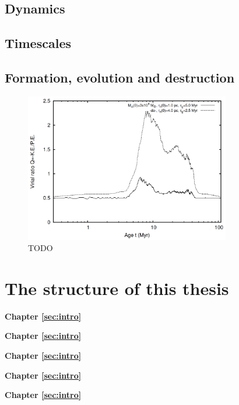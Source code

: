 \subsection{Dynamics}
\label{sec:intro:theory:dynamics}


\subsection{Timescales}
\label{sec:intro:theory:timescales}


\subsection{Formation, evolution and destruction}
\label{sec:intro:theory:evolution}

\begin{figure}[tb]
	\centering
	\includegraphics[width=0.8\textwidth]{fig/c1/virialisation_placid_gas_expulsion.png}
	\caption[TODO]{TODO}
	\label{fig:intro:theory:feedback}
\end{figure}


\section{The structure of this thesis}
\label{sec:intro:structure}

\textbf{Chapter \ref{sec:intro}} \\[0.2em]
\blindtext

\textbf{Chapter \ref{sec:intro}} \\[0.2em]
\blindtext

\textbf{Chapter \ref{sec:intro}} \\[0.2em]
\blindtext

\textbf{Chapter \ref{sec:intro}} \\[0.2em]
\blindtext

\textbf{Chapter \ref{sec:intro}} \\[0.2em]
\blindtext
